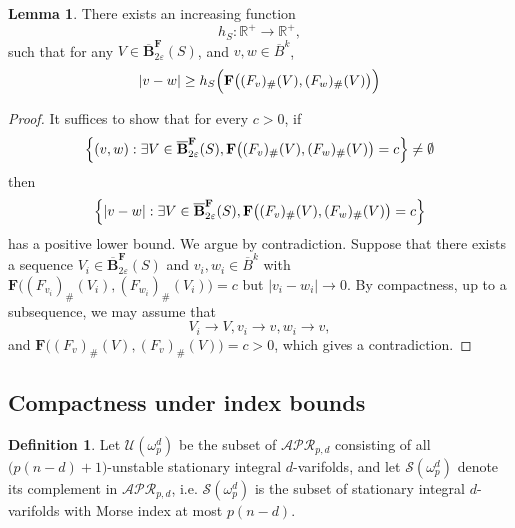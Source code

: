 \documentclass[12pt,english]{article}
\theoremstyle{definition}
\newtheorem{lemma}[theorem]{Lemma}
\newtheorem{definition}[theorem]{Definition}
\begin{document}
\begin{lemma} \label{lem:dist_F}
    There exists an increasing function
    \begin{equation*}
        h_S : \mathbb{R}^+ \rightarrow \mathbb{R}^+,
    \end{equation*}
    such that for any $V \in \overline{\mathbf{B}}^{\mathbf{F}}_{2\varepsilon}(S)$, and $v, w \in \overline{B}^k$,
    \begin{equation*}
        |v - w| \geq h_S \Bigl(\mathbf{F}\bigl((F_v)_\#(V), (F_w)_\#(V)\bigr)\Bigr)
    \end{equation*}
\end{lemma}
\begin{proof}
It suffices to show that for every $c > 0$, if
\begin{equation*}
    \Bigl\{ (v,w) : \exists V \in \overline{\mathbf{B}}^{\mathbf{F}}_{2\varepsilon}(S), \mathbf{F}\bigl((F_v)_\#(V), (F_w)_\#(V)\bigr) = c \Bigr\} \neq \emptyset
\end{equation*}
then
\begin{equation*}
    \Bigl\{ | v - w | : \exists V \in \overline{\mathbf{B}}^{\mathbf{F}}_{2\varepsilon}(S), \mathbf{F}\bigl((F_v)_\#(V), (F_w)_\#(V)\bigr) = c \Bigr\}
\end{equation*}
has a positive lower bound. We argue by contradiction. Suppose that there exists a sequence $V_i \in \overline{\mathbf{B}}^{\mathbf{F}}_{2\varepsilon}(S)$ and $v_i, w_i \in \overline{B}^k$ with $\mathbf{F}\bigl((F_{v_i})_\#(V_i), (F_{w_i})_\#(V_i)\bigr) = c$ but $| v_i - w_i | \rightarrow 0$. By compactness, up to a subsequence, we may assume that
\begin{equation*}
    V_i \rightarrow V, v_i \rightarrow v, w_i \rightarrow v,
\end{equation*}
and $\mathbf{F}\bigl((F_v)_\#(V), (F_v)_\#(V)\bigr) = c > 0$, which gives a contradiction.
\end{proof}

\subsection{Compactness under index bounds}\label{subsec-compact}

\begin{definition}
    Let \(\mathcal{U}(\omega^d_p)\) be the subset of \(\mathcal{APR}_{p,d}\) consisting of all \(\bigl(p(n-d)+1\bigr)\)-unstable stationary integral $d$-varifolds, and let \(\mathcal{S}(\omega^d_p)\) denote its complement in \(\mathcal{APR}_{p,d}\), i.e. \(\mathcal{S}(\omega^d_p)\) is the subset of stationary integral $d$-varifolds with Morse index at most \(p(n-d)\).
\end{definition}
\end{document}
